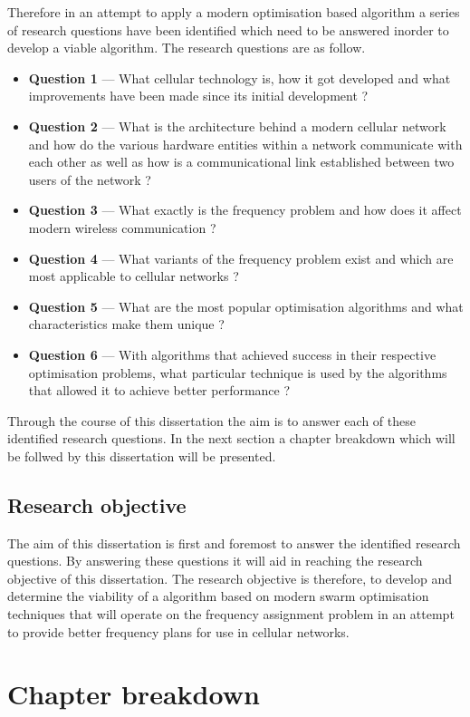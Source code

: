 Therefore in an attempt to apply a modern optimisation based algorithm a series of research questions have been identified which need to be answered inorder to develop a viable algorithm. The research questions are as follow.
\begin{itemize}
\item \textbf{Question 1} --- What cellular technology is, how it got developed and what improvements have been made since its initial development ?
\item \textbf{Question 2} --- What is the architecture behind a modern cellular network and how do the various hardware entities within a network communicate with each other as well as how is a communicational link established between two users of the network ?
\item \textbf{Question 3} --- What exactly is the frequency problem and how does it affect modern wireless communication ?
\item \textbf{Question 4} --- What variants of the frequency problem exist and which are most applicable to cellular networks ?
\item \textbf{Question 5} --- What are the most popular optimisation algorithms and what characteristics make them unique ?
\item \textbf{Question 6} --- With algorithms that achieved success in their respective optimisation problems, what particular technique is used by the algorithms that allowed it to achieve better performance ?
\end{itemize}

Through the course of this dissertation the aim is to answer each of these identified research questions. In the next section a chapter breakdown which will be follwed by this dissertation will be presented.

\subsection{Research objective}
The aim of this dissertation is first and foremost to answer the identified research questions. By answering these questions it will aid in reaching the research objective of this dissertation. The research objective is therefore, to develop and determine the viability of a algorithm based on modern swarm optimisation techniques that will operate on the frequency assignment problem in an attempt to provide better frequency plans for use in cellular networks.
\section {Chapter breakdown}
